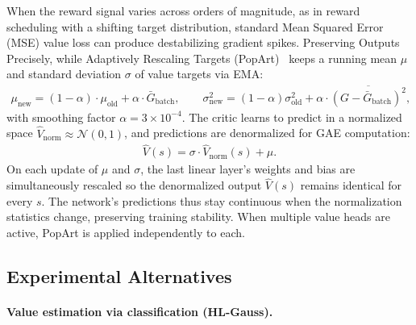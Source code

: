 When the reward signal varies across orders of magnitude, as in reward scheduling with a shifting target distribution, standard Mean Squared Error (MSE) value loss can produce destabilizing gradient spikes. Preserving Outputs Precisely, while Adaptively Rescaling Targets (PopArt)~\cite{vanhasseltLearningValuesMany2016} keeps a running mean $\mu$ and standard deviation $\sigma$ of value targets via EMA:
\begin{align}
\mu_{\text{new}} = (1 - \alpha) \cdot \mu_{\text{old}} + \alpha \cdot \bar{G}_{\text{batch}}, \qquad \sigma^2_{\text{new}}=(1-\alpha)\sigma^2_{\text{old}}+\alpha \cdot \overline{(G-\bar G_{\text{batch}})^2},
\end{align}
with smoothing factor $\alpha = 3 \times 10^{-4}$. The critic learns to predict in a normalized space $\hat{V}_{\text{norm}} \approx \mathcal{N}(0,1)$, and predictions are denormalized for GAE computation:
\begin{align}
\hat{V}(s) = \sigma \cdot \hat{V}_{\text{norm}}(s) + \mu.
\end{align}
On each update of $\mu$ and $\sigma$, the last linear layer's weights and bias are simultaneously rescaled so the denormalized output $\hat{V}(s)$ remains identical for every $s$. The network's predictions thus stay continuous when the normalization statistics change, preserving training stability. When multiple value heads are active, PopArt is applied independently to each.

\subsection*{Experimental Alternatives}

\paragraph{Value estimation via classification (HL-Gauss).}

